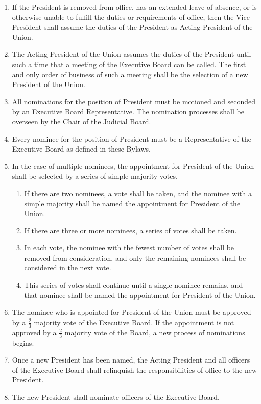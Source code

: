\begin{enumerate}
\item If the President is removed from office, has an extended leave of absence, or is otherwise unable to fulfill the duties or requirements of office, then the Vice President shall assume the duties of the President as Acting President of the Union.
\item The Acting President of the Union assumes the duties of the President until such a time that a meeting of the Executive Board can be called. The first and only order of business of such a meeting shall be the selection of a new President of the Union.
\item All nominations for the position of President must be motioned and seconded by an Executive Board Representative. The nomination processes shall be overseen by the Chair of the Judicial Board.
\item Every nominee for the position of President must be a Representative of the Executive Board as defined in these Bylaws.
\item In the case of multiple nominees, the appointment for President of the Union shall be selected by a series of simple majority votes.
\begin{enumerate}
\item If there are two nominees, a vote shall be taken, and the nominee with a simple majority shall be named the appointment for President of the Union.
\item If there are three or more nominees, a series of votes shall be taken.
\item In each vote, the nominee with the fewest number of votes shall be removed from consideration, and only the remaining nominees shall be considered in the next vote.
\item This series of votes shall continue until a single nominee remains, and that 
nominee shall be named the appointment for President of the Union.
\end{enumerate}
\item The nominee who is appointed for President of the Union must be approved by a $\frac{2}{3}$ majority vote of the Executive Board. If the appointment is not approved by a $\frac{2}{3}$ majority vote of the Board, a new process of nominations begins.
\item Once a new President has been named, the Acting President and all officers of the Executive Board shall relinquish the responsibilities of office to the new President.
\item The new President shall nominate officers of the Executive Board.
\end{enumerate}